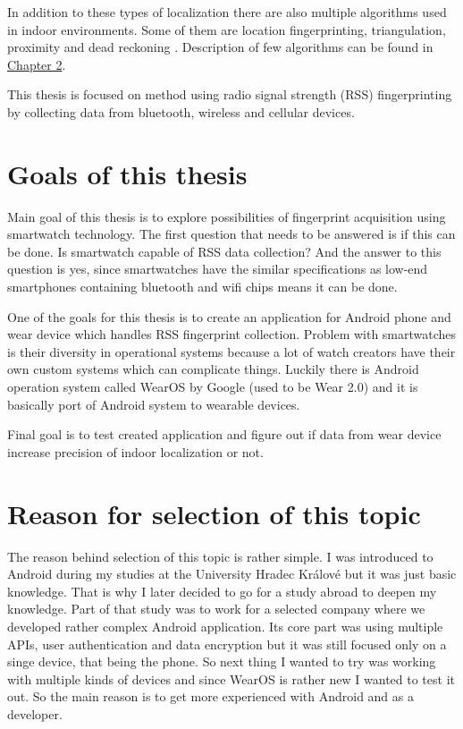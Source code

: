 In addition to these types of localization there are also multiple algorithms used in indoor environments. Some of them are location fingerprinting, triangulation, proximity and dead reckoning \cite{AaPLocalisation}. Description of few algorithms can be found in \hyperref[sec:LocalizationTechniques]{Chapter 2}.

This thesis is focused on method using radio signal strength (RSS) fingerprinting by collecting data from bluetooth, wireless and cellular devices.

\section{Goals of this thesis}\label{sec:GoalsOfThisThesis}
Main goal of this thesis is to explore possibilities of fingerprint acquisition using smartwatch technology. The first question that needs to be answered is if this can be done. Is smartwatch capable of RSS data collection? And the answer to this question is yes, since smartwatches have the similar specifications as low-end smartphones containing bluetooth and wifi chips means it can be done. 

One of the goals for this thesis is to create an application for Android phone and wear device which handles RSS fingerprint collection. Problem with smartwatches is their diversity in operational systems because a lot of watch creators have their own custom systems which can complicate things. Luckily there is Android operation system called WearOS by Google (used to be Wear 2.0) and it is basically port of Android system to wearable devices. 

Final goal is to test created application and figure out if data from wear device increase precision of indoor localization or not.

\section{Reason for selection of this topic}\label{sec:ReasonForSelectionOfThisTopic}
The reason behind selection of this topic is rather simple. I was introduced to Android during my studies at the University Hradec Králové but it was just basic knowledge. That is why I later decided to go for a study abroad to deepen my knowledge. Part of that study was to work for a selected company where we developed rather complex Android application. Its core part was using multiple APIs, user authentication and data encryption but it was still focused only on a singe device, that being the phone. So next thing I wanted to try was working with multiple kinds of devices and since WearOS is rather new I wanted to test it out. So the main reason is to get more experienced with Android and as a developer.
